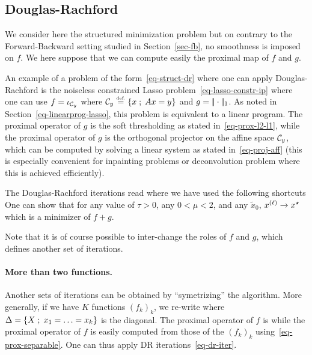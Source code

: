 \subsection{Douglas-Rachford}
\label{sec-dr}

We consider here the structured minimization problem
but on contrary to the Forward-Backward setting studied in Section~\ref{sec-fb}, no smoothness is imposed on $f$. We here suppose that we can compute easily the proximal map of $f$ and $g$.

\begin{exmp}
An example of a problem of the form~\eqref{eq-struct-dr} where one can apply Douglas-Rachford is the noiseless constrained Lasso problem~\eqref{eq-lasso-constr-ip}
where one can use $f=\iota_{\Cc_y}$ where $\Cc_y \eqdef \enscond{x}{Ax=y}$ and $g=\norm{\cdot}_1$.
%
As noted in Section~\ref{eq-linearprog-lasso}, this problem is equivalent to a linear program.
%
The proximal operator of $g$ is the soft thresholding as stated in~\eqref{eq-prox-l2-l1}, while the proximal operator of $g$ is the orthogonal projector on the affine space $\Cc_y$, which can be computed by solving a linear system as stated in~\eqref{eq-proj-aff} (this is especially convenient for inpainting problems or deconvolution problem where this is achieved efficiently).
\end{exmp}

The Douglas-Rachford iterations read
where we have used the following shortcuts
One can show that for any value of $\tau>0$, any $0 < \mu < 2$,  and any $\tilde x_0$, $\it{x} \rightarrow x^\star$ which is a minimizer of $f+g$.

Note that it is of course possible to inter-change the roles of $f$ and $g$, which defines another set of iterations.

\paragraph{More than two functions.}

Another sets of iterations can be obtained by ``symetrizing'' the algorithm. More generally, if we have $K$ functions $(f_k)_k$, we re-write 
where $\Delta=\enscond{X}{x_1=\ldots=x_k}$ is the diagonal. The proximal operator of $f$ is 
while the proximal operator of $f$ is easily computed from those of the $(f_k)_k$ using~\eqref{eq-prox-separable}. One can thus apply DR iterations~\eqref{eq-dr-iter}.

